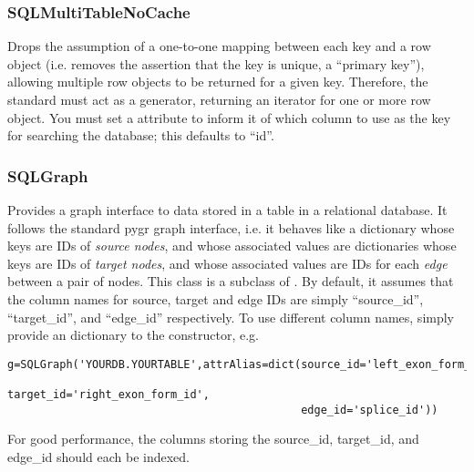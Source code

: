 \documentclass{howto}
\begin{document}
\subsubsection{SQLMultiTableNoCache}
Drops the assumption of a one-to-one
mapping between each key and a row object (i.e. removes the
assertion that the key is unique, a ``primary key''), allowing
multiple row objects to be returned for a given key.  Therefore,
the standard  must act as a generator, returning
an iterator for one or more row object.  You must set a 
 attribute to inform it of which 
column to use as the key for searching the database;
this defaults to ``id''.

\subsubsection{SQLGraph}
Provides a graph interface to data stored in a table
in a relational database.  It follows the standard pygr 
graph interface, i.e. it behaves like a dictionary whose
keys are IDs of {\em source nodes}, and whose associated
values are dictionaries whose keys are IDs of {\em target nodes},
and whose associated values are IDs for each {\em edge} between
a pair of nodes.  This class is a subclass of 
.  By default, it assumes that
the column names for source, target and edge IDs are simply
``source_id'', ``target_id'', and ``edge_id'' respectively.
To use different column names, simply provide an 
dictionary to the constructor, e.g.
\begin{verbatim}
g=SQLGraph('YOURDB.YOURTABLE',attrAlias=dict(source_id='left_exon_form_id',
                                             target_id='right_exon_form_id',
                                             edge_id='splice_id'))
\end{verbatim}
For good performance, the columns storing the source_id, target_id,
and edge_id should each be indexed.
\end{document}
